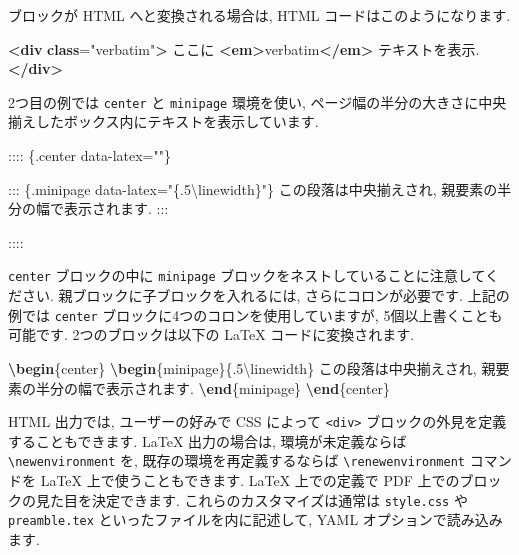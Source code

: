 \documentclass[
  11pt,
  lualatex,ja=standard,jafont=noto]{bxjsreport}
\newenvironment{Shaded}{\begin{snugshade}}{\end{snugshade}}
\newcommand{\ErrorTok}[1]{\textcolor[rgb]{0.64,0.00,0.00}{\textbf{#1}}}
\newcommand{\ExtensionTok}[1]{#1}
\newcommand{\FunctionTok}[1]{\textcolor[rgb]{0.00,0.00,0.00}{#1}}
\newcommand{\KeywordTok}[1]{\textcolor[rgb]{0.13,0.29,0.53}{\textbf{#1}}}
\newcommand{\NormalTok}[1]{#1}
\newcommand{\OtherTok}[1]{\textcolor[rgb]{0.56,0.35,0.01}{#1}}
\newcommand{\StringTok}[1]{\textcolor[rgb]{0.31,0.60,0.02}{#1}}
\begin{document}
ブロックが HTML へと変換される場合は, HTML コードはこのようになります.

\begin{Shaded}
\begin{Highlighting}[]
\KeywordTok{\textless{}div} \ErrorTok{class}\OtherTok{=}\StringTok{"verbatim"}\KeywordTok{\textgreater{}}
\NormalTok{ここに }\KeywordTok{\textless{}em\textgreater{}}\NormalTok{verbatim}\KeywordTok{\textless{}/em\textgreater{}}\NormalTok{ テキストを表示.}
\KeywordTok{\textless{}/div\textgreater{}}
\end{Highlighting}
\end{Shaded}

2つ目の例では \texttt{center} と \texttt{minipage} 環境を使い, ページ幅の半分の大きさに中央揃えしたボックス内にテキストを表示しています.

\begin{Shaded}
\begin{Highlighting}[]
\NormalTok{:::: \{.center data{-}latex=""\}}

\NormalTok{::: \{.minipage data{-}latex="\{.5\textbackslash{}linewidth\}"\}}
\NormalTok{この段落は中央揃えされ, 親要素の半分の幅で表示されます.}
\NormalTok{:::}

\NormalTok{::::}
\end{Highlighting}
\end{Shaded}

\texttt{center} ブロックの中に \texttt{minipage} ブロックをネストしていることに注意してください. 親ブロックに子ブロックを入れるには, さらにコロンが必要です. 上記の例では \texttt{center} ブロックに4つのコロンを使用していますが, 5個以上書くことも可能です. 2つのブロックは以下の LaTeX コードに変換されます.

\begin{Shaded}
\begin{Highlighting}[]
\KeywordTok{\textbackslash{}begin}\NormalTok{\{}\ExtensionTok{center}\NormalTok{\}}
\KeywordTok{\textbackslash{}begin}\NormalTok{\{}\ExtensionTok{minipage}\NormalTok{\}\{.5}\FunctionTok{\textbackslash{}linewidth}\NormalTok{\}}
\NormalTok{この段落は中央揃えされ, 親要素の半分の幅で表示されます.}
\KeywordTok{\textbackslash{}end}\NormalTok{\{}\ExtensionTok{minipage}\NormalTok{\}}
\KeywordTok{\textbackslash{}end}\NormalTok{\{}\ExtensionTok{center}\NormalTok{\}}
\end{Highlighting}
\end{Shaded}

HTML 出力では, ユーザーの好みで CSS によって \texttt{\textless{}div\textgreater{}} ブロックの外見を定義することもできます. LaTeX 出力の場合は, 環境が未定義ならば \texttt{\textbackslash{}newenvironment} を, 既存の環境を再定義するならば \texttt{\textbackslash{}renewenvironment} コマンドを LaTeX 上で使うこともできます. LaTeX 上での定義で PDF 上でのブロックの見た目を決定できます. これらのカスタマイズは通常は \texttt{style.css} や \texttt{preamble.tex} といったファイルを内に記述して, YAML オプションで読み込みます.
\end{document}
